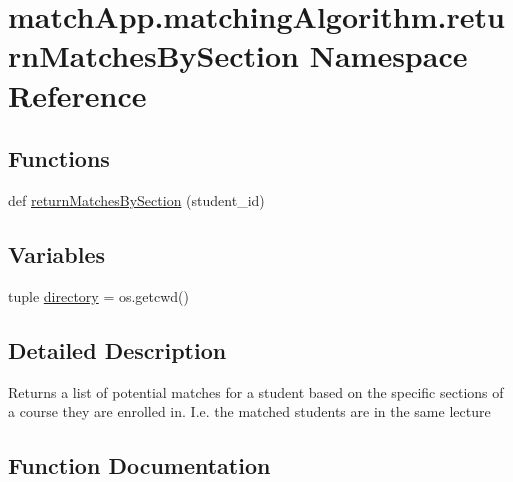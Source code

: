\hypertarget{namespacematch_app_1_1matching_algorithm_1_1return_matches_by_section}{}\section{match\+App.\+matching\+Algorithm.\+return\+Matches\+By\+Section Namespace Reference}
\label{namespacematch_app_1_1matching_algorithm_1_1return_matches_by_section}
\subsection*{Functions}
\begin{DoxyCompactItemize}
\item 
def \hyperlink{namespacematch_app_1_1matching_algorithm_1_1return_matches_by_section_ab13dbdb66bd216ea7facbd7d9884ff7c}{return\+Matches\+By\+Section} (student\+\_\+id)
\end{DoxyCompactItemize}
\subsection*{Variables}
\begin{DoxyCompactItemize}
\item 
tuple \hyperlink{namespacematch_app_1_1matching_algorithm_1_1return_matches_by_section_ae91ce4701feda170cf881dfdea9d4fc6}{directory} = os.\+getcwd()
\end{DoxyCompactItemize}


\subsection{Detailed Description}
\begin{DoxyVerb}Returns a list of potential matches for a student based on the specific sections of a course they
are enrolled in. I.e. the matched students are in the same lecture\end{DoxyVerb}
 

\subsection{Function Documentation}
\hypertarget{namespacematch_app_1_1matching_algorithm_1_1return_matches_by_section_ab13dbdb66bd216ea7facbd7d9884ff7c}{}
